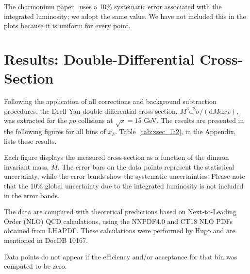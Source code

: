 \documentclass[11pt]{article}
\newcommand{\diffd}{\mathrm{d}}
\begin{document}
The charmonium paper~\cite{charmonium} uses a 10\% systematic error associated with the integrated luminosity; we adopt the same value. We have not included this in the plots because it is uniform for every point.

\section{Results: Double-Differential Cross-Section}
\label{sec:results}
Following the application of all corrections and background subtraction procedures, the Drell-Yan double-differential cross-section, $M^3 \diffd^2\sigma / (\diffd M \diffd x_F)$, was extracted for the $pp$ collisions at $\sqrt{s} = 15$ GeV. The results are presented in the following figures for all bins of $x_F$. Table~\ref{tab:xsec_lh2}, in the Appendix, lists these results.

Each figure displays the measured cross-section as a function of the dimuon invariant mass, $M$. The error bars on the data points represent the statistical uncertainty, while the error bands show the systematic uncertainties. Please note that the 10\% global uncertainty due to the integrated luminosity is not included in the error bands.

The data are compared with theoretical predictions based on Next-to-Leading Order (NLO) QCD calculations, using the NNPDF4.0 and CT18 NLO PDFs obtained from LHAPDF.  These calculations were performed by Hugo and are mentioned in DocDB 10167. 

Data points do not appear if the efficiency and/or acceptance for that bin was computed to be zero.  
\end{document}

